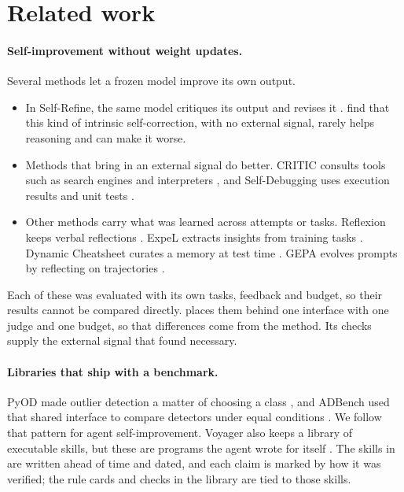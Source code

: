 \section{Related work}
\label{sec:related}

\paragraph{Self-improvement without weight updates.}
Several methods let a frozen model improve its own output.
\begin{itemize}
\item In Self-Refine, the same model critiques its output and revises it
\citep{madaan2023selfrefine}. \citet{huang2024cannot} find that this kind of intrinsic
self-correction, with no external signal, rarely helps reasoning and can make it worse.
\item Methods that bring in an external signal do better. CRITIC consults tools such as
search engines and interpreters \citep{gou2024critic}, and Self-Debugging uses execution
results and unit tests \citep{chen2024selfdebug}.
\item Other methods carry what was learned across attempts or tasks. Reflexion keeps verbal
reflections \citep{shinn2023reflexion}. ExpeL extracts insights from training tasks
\citep{zhao2024expel}. Dynamic Cheatsheet curates a memory at test time
\citep{suzgun2026dynamic}. GEPA evolves prompts by reflecting on trajectories
\citep{agrawal2026gepa}.
\end{itemize}
Each of these was evaluated with its own tasks, feedback and budget, so their results cannot
be compared directly. \lib{} places them behind one interface with one judge and one budget,
so that differences come from the method. Its checks supply the external signal that
\citeauthor{huang2024cannot} found necessary.

\paragraph{Libraries that ship with a benchmark.}
PyOD made outlier detection a matter of choosing a class \citep{zhao2019pyod}, and ADBench
used that shared interface to compare detectors under equal conditions \citep{han2022adbench}.
We follow that pattern for agent self-improvement. Voyager also keeps a library of executable
skills, but these are programs the agent wrote for itself \citep{wang2024voyager}. The skills
in \lib{} are written ahead of time and dated, and each claim is marked by how it was
verified; the rule cards and checks in the library are tied to those skills.


